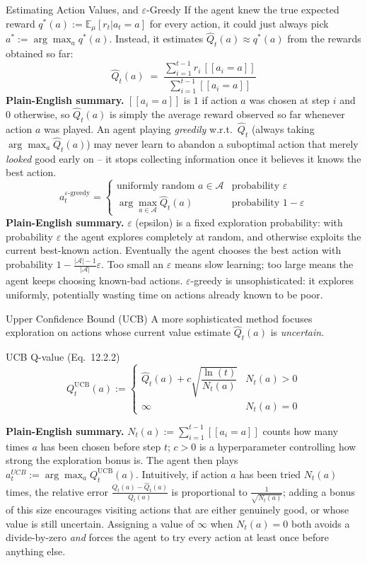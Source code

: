 \documentclass[aspectratio=169,10pt]{beamer}
\newcommand{\EE}{\mathbb{E}}
\newcommand{\Acal}{\mathcal{A}}
\begin{document}
\begin{frame}{Estimating Action Values, and $\varepsilon$-Greedy}
If the agent knew the true expected reward $q^*(a):=\EE_\mu[r_t|a_t=a]$ for every action,
it could just always pick $a^*:=\arg\max_a q^*(a)$. Instead, it estimates
$\widehat Q_t(a)\approx q^*(a)$ from the rewards obtained so far:
$$\widehat Q_t(a) \;=\; \frac{\sum_{i=1}^{t-1} r_i\,[\![a_i=a]\!]}{\sum_{i=1}^{t-1}[\![a_i=a]\!]}$$
\textbf{Plain-English summary.} $[\![a_i=a]\!]$ is $1$ if action $a$ was chosen at step
$i$ and $0$ otherwise, so $\widehat Q_t(a)$ is simply the average reward observed so far
whenever action $a$ was played. An agent playing \emph{greedily} w.r.t.\ $\widehat Q_t$
(always taking $\arg\max_a\widehat Q_t(a)$) may never learn to abandon a suboptimal action
that merely \emph{looked} good early on -- it stops collecting information once it
believes it knows the best action.
$$a_t^{\varepsilon\text{-greedy}} = \begin{cases}
\text{uniformly random } a\in\Acal & \text{probability } \varepsilon\\
\arg\max_{a\in\Acal}\widehat Q_t(a) & \text{probability } 1-\varepsilon
\end{cases}$$
\textbf{Plain-English summary.} $\varepsilon$ (epsilon) is a fixed exploration
probability: with probability $\varepsilon$ the agent explores completely at random, and
otherwise exploits the current best-known action. Eventually the agent chooses the best
action with probability $1-\frac{|\Acal|-1}{|\Acal|}\varepsilon$. Too small an
$\varepsilon$ means slow learning; too large means the agent keeps choosing known-bad
actions. $\varepsilon$-greedy is unsophisticated: it explores uniformly, potentially
wasting time on actions already known to be poor.
\end{frame}

\begin{frame}{Upper Confidence Bound (UCB)}
A more sophisticated method focuses exploration on actions whose current value estimate
$\widehat Q_t(a)$ is \emph{uncertain}.
\begin{block}{UCB Q-value (Eq.\ 12.2.2)}
$$Q_t^{\mathrm{UCB}}(a) := \begin{cases}
\widehat Q_t(a) + c\sqrt{\dfrac{\ln(t)}{N_t(a)}} & N_t(a)>0\\[4pt]
\infty & N_t(a)=0
\end{cases}$$
\end{block}
\textbf{Plain-English summary.} $N_t(a):=\sum_{i=1}^{t-1}[\![a_i=a]\!]$ counts how many
times $a$ has been chosen before step $t$; $c>0$ is a hyperparameter controlling how
strong the exploration bonus is. The agent then plays
$a_t^{UCB}:=\arg\max_a Q_t^{\mathrm{UCB}}(a)$. Intuitively, if action $a$ has been tried
$N_t(a)$ times, the relative error $\frac{Q_t(a)-\widehat Q_t(a)}{Q_t(a)}$ is proportional
to $\frac{1}{\sqrt{N_t(a)}}$; adding a bonus of this size encourages visiting actions that
are either genuinely good, or whose value is still uncertain. Assigning a value of
$\infty$ when $N_t(a)=0$ both avoids a divide-by-zero \emph{and} forces the agent to try
every action at least once before anything else.
\end{frame}
\end{document}
